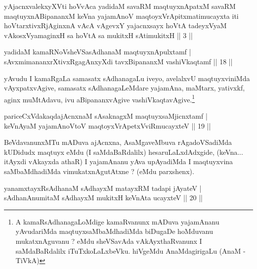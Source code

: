 
\begin{shl}
yAjacnxvalekxyXVti hoVvAca yadidaM savaRM maqtuyxnApatxM savaRM maqtuyxnABipananxM keVna yajamAnoV maqtoyxVrApitxmatimucayxta iti hoVtarxtivxRjAginxnA vAcA vAgevxY yajacnxsayx hoVtA tadeyxVyaM vAkosxV\s yamaginxH sa hoVtA sa mukitxH sAtimukitxH || 3 ||
\end{shl}


\begin{shl}
yadidaM kamaRNoV\s sheVSasAdhanaM maqtuyxnA\s \s pulxtamf |\\
sAvxmimananxrXtivxRgagAnxyXdi tavxBipananxM vashiVkaqtamf \hfill || 18 ||
\end{shl}

\begin{artha}
yAvudu I kamaRgaLa samasatx sAdhanagaLu iveyo, avelalxvU maqtuyxviniMda vAyxpatxvAgive, samasatx sAdhanagaLeMdare yajamAna, maMtarx, yativxkf, aginx muMtAdavu, ivu aBipananxvAgive vashiVkaqtavAgive.\footnote[3]{A kamaRsAdhanagaLoMdige kamaRvanunx mADuva yajamAnanu yAvudariMda maqtuyxsaMbaMdhadiMda biDugaDe hoMduvanu mukatxnAguvanu ? eMdu sheVSavAda vAkAyxthaRvanunx I saMdaBaRdalilx iTuTxkoLaLxbeVku. hiVgeMdu AnaMdagirigaLu (AnaM - TiVkA)}
\end{artha}


\begin{shl}
pariceCxVdakaqdajAcnxnaM sAsaknagxM maqtuyxsaMjicnxtamf |\\
keVnAyaM yajamAnoV\s toV maqtoyxVrApetxVviRmucayxteV \hfill || 19 ||
\end{shl}

\begin{artha}
BeVdavanunxMTu mADuva ajAcnxna, AsaMgaveMbuva rAgadoVSadiMda kUDidudx maqtuyx eMdu (I saMdaBaRdalilx) hesaruLaLxdAdxgide, (keVna... itAyxdi vAkayxda athaR) I yajamAnanu yAva upAyadiMda I maqtuyxvina saMbaMdhadiMda vimukatxnAgutAtxne ? (eMdu parxshenx).
\end{artha}


\begin{shl}
yanamxtayxRsAdhanaM sAdhayxM matayxRM tadapi jAyateV |\\
sAdhanAnumitaM sAdhayxM mukitxH keVnAta ucayxteV \hfill || 20 ||
\end{shl}

